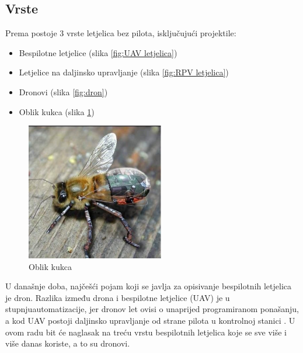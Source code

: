 \documentclass[times, utf8, diplomski]{fer}
\begin{document}
\subsection{Vrste}
Prema \citet{UAVSystems} postoje  3  vrste  letjelica  bez  pilota,  isključujući 
projektile: \begin{itemize}
\item Bespilotne letjelice  (slika \ref{fig:UAV letjelica})
\item Letjelice na daljinsko upravljanje  (slika \ref{fig:RPV letjelica})
\item Dronovi  (slika \ref{fig:dron})
\item Oblik kukca  (slika \ref{fig:oblik kukca})
\end{itemize}
\begin{figure}[htb]
\centering
\includegraphics[width=6cm]{img/insect_fly_shaped_drone.png}
\caption{Oblik kukca\protect\footnotemark}
\label{fig:oblik kukca}
\end{figure}
U današnje doba, najčešći pojam koji se javlja za opisivanje bespilotnih letjelica je dron. Razlika između drona i bespilotne letjelice (UAV) je u stupnjuautomatizacije, jer dronov let ovisi o unaprijed programiranom ponašanju, a kod UAV postoji daljinsko upravljanje od strane pilota  u  kontrolnoj  stanici \citep{UAVInsider}. U ovom radu bit će naglasak na treću vrstu bespilotnih letjelica koje se sve više i više danas koriste, a to su dronovi. 
\end{document}

